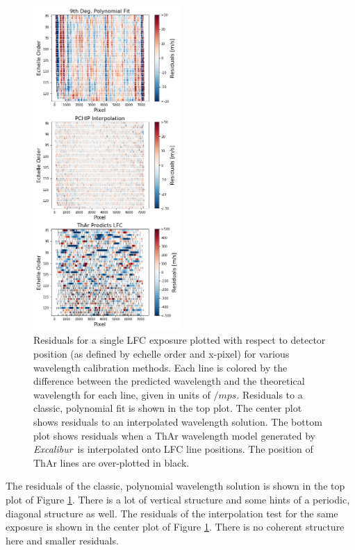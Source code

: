 \documentclass[modern]{aastex63}
\newcommand{\project}[1]{\textsl{#1}}
\newcommand{\name}{\project{Excalibur}}
\begin{document}
\begin{figure}[t]
\centering
\includegraphics[width=0.5\textwidth]{Figures/lineResids2D_col.png}
\caption{Residuals for a single LFC exposure plotted with respect to detector position (as defined by echelle order and x-pixel) for various wavelength calibration methods.  Each line is colored by the difference between the predicted wavelength and the theoretical wavelength for each line, given in units of $/mps$.  Residuals to a classic, polynomial fit is shown in the top plot.  The center plot shows residuals to an interpolated wavelength solution.  The bottom plot shows residuals when a ThAr wavelength model generated by \name\ is interpolated onto LFC line positions.  The position of ThAr lines are over-plotted in black.}
\label{fig:resid2d}
\end{figure}

The residuals of the classic, polynomial wavelength solution is shown in the top plot of Figure \ref{fig:resid2d}.  There is a lot of vertical structure and some hints of a periodic, diagonal structure as well.  The residuals of the interpolation test for the same exposure is shown in the center plot of Figure \ref{fig:resid2d}.  There is no coherent structure here and smaller residuals.
\end{document}
